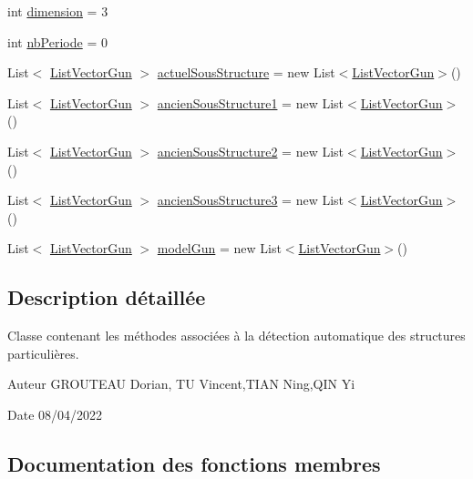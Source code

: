 \begin{DoxyCompactItemize}
\item 
int \mbox{\hyperlink{class_detection_afa1d30c1e85af8e9f22288c871a80e27}{dimension}} = 3
\item 
int \mbox{\hyperlink{class_detection_afa6a24f82533b8f55ad0d7ff325f62fd}{nb\+Periode}} = 0
\item 
List$<$ \mbox{\hyperlink{class_list_vector_gun}{List\+Vector\+Gun}} $>$ \mbox{\hyperlink{class_detection_a938e31196e8d2c8a7449d2b92dd3dc0f}{actuel\+Sous\+Structure}} = new List$<$\mbox{\hyperlink{class_list_vector_gun}{List\+Vector\+Gun}}$>$()
\item 
List$<$ \mbox{\hyperlink{class_list_vector_gun}{List\+Vector\+Gun}} $>$ \mbox{\hyperlink{class_detection_a2854566b0e9b52fde71352bd8d3e7ef5}{ancien\+Sous\+Structure1}} = new List$<$\mbox{\hyperlink{class_list_vector_gun}{List\+Vector\+Gun}}$>$()
\item 
List$<$ \mbox{\hyperlink{class_list_vector_gun}{List\+Vector\+Gun}} $>$ \mbox{\hyperlink{class_detection_a5cc275445061be79380716942235b51b}{ancien\+Sous\+Structure2}} = new List$<$\mbox{\hyperlink{class_list_vector_gun}{List\+Vector\+Gun}}$>$()
\item 
List$<$ \mbox{\hyperlink{class_list_vector_gun}{List\+Vector\+Gun}} $>$ \mbox{\hyperlink{class_detection_a3020aaba1943a1f3e42220ede1b1e7c4}{ancien\+Sous\+Structure3}} = new List$<$\mbox{\hyperlink{class_list_vector_gun}{List\+Vector\+Gun}}$>$()
\item 
List$<$ \mbox{\hyperlink{class_list_vector_gun}{List\+Vector\+Gun}} $>$ \mbox{\hyperlink{class_detection_ae14cf1144858a30db9892e36723e9795}{model\+Gun}} = new List$<$\mbox{\hyperlink{class_list_vector_gun}{List\+Vector\+Gun}}$>$()
\end{DoxyCompactItemize}


\subsection{Description détaillée}
Classe contenant les méthodes associées à la détection automatique des structures particulières. 

\begin{DoxyAuthor}{Auteur}
G\+R\+O\+U\+T\+E\+AU Dorian, TU Vincent,T\+I\+AN Ning,Q\+IN Yi 
\end{DoxyAuthor}
\begin{DoxyDate}{Date}
08/04/2022 
\end{DoxyDate}


\subsection{Documentation des fonctions membres}
\mbox{\label{class_detection_a92c60be1a69ea74b7f7bef04a0e53238}} 
